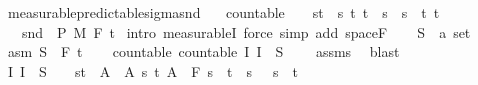 \begin{isabellebody}
\endisatagproof
{\isafoldproof}%
%
\isadelimproof
\isanewline
%
\endisadelimproof
\isanewline
{}\isamarkupfalse%
\ measurable{\isacharunderscore}{\kern0pt}predictable{\isacharunderscore}{\kern0pt}sigma{\isacharunderscore}{\kern0pt}snd{\isacharcolon}{\kern0pt}\isanewline
\ \ \ {\isachardoublequoteopen}countable\ {\isasymI}{\isachardoublequoteclose}\ {\isachardoublequoteopen}{\isasymI}\ {\isasymsubseteq}\ {\isacharbraceleft}{\kern0pt}{\isacharbraceleft}{\kern0pt}s{\isacharless}{\kern0pt}{\isachardot}{\kern0pt}{\isachardot}{\kern0pt}t{\isacharbraceright}{\kern0pt}\ {\isacharbar}{\kern0pt}\ s\ t{\isachardot}{\kern0pt}\ t\ {\isasymle}\ s\ {\isasymand}\ s\ {\isacharless}{\kern0pt}\ t{\isacharbraceright}{\kern0pt}{\isachardoublequoteclose}\ {\isachardoublequoteopen}{\isacharbraceleft}{\kern0pt}t\ {\isasymsubseteq}\ {\isacharparenleft}{\kern0pt}{\isasymUnion}{\isasymI}{\isacharparenright}{\kern0pt}{\isachardoublequoteclose}\isanewline
\ \ \ {\isachardoublequoteopen}snd\ {\isasymin}\ {\isasymSigma}\isactrlsub P\ {\isasymrightarrow}\isactrlsub M\ F\ t\isanewline
%
\isadelimproof
%
\endisadelimproof
%
\isatagproof
{}\isamarkupfalse%
\ {\isacharparenleft}{\kern0pt}intro\ measurableI{\isacharcomma}{\kern0pt}\ force\ simp\ add{\isacharcolon}{\kern0pt}\ space{\isacharunderscore}{\kern0pt}F{\isacharparenright}{\kern0pt}\isanewline
\ \ \isamarkupfalse%
\ S\ {\isacharcolon}{\kern0pt}{\isacharcolon}{\kern0pt}\ {\isachardoublequoteopen}{\isacharprime}{\kern0pt}a\ set{\isachardoublequoteclose}\ \isamarkupfalse%
\ asm{\isacharcolon}{\kern0pt}\ {\isachardoublequoteopen}S\ {\isasymin}\ F\ t\isanewline
\ \ \isamarkupfalse%
\ countable{\isacharcolon}{\kern0pt}\ {\isachardoublequoteopen}countable\ {\isacharparenleft}{\kern0pt}{\isacharparenleft}{\kern0pt}{\isasymlambda}I{\isachardot}{\kern0pt}\ I\ {\isasymtimes}\ S{\isacharparenright}{\kern0pt}\ {\isacharbackquote}{\kern0pt}\ {\isasymI}{\isacharparenright}{\kern0pt}{\isachardoublequoteclose}\ \isamarkupfalse%
\ assms{\isacharparenleft}{\kern0pt}{}{\isacharparenright}{\kern0pt}\ \isamarkupfalse%
\ blast\isanewline
\ \ \isamarkupfalse%
\ {\isachardoublequoteopen}{\isacharparenleft}{\kern0pt}{\isasymlambda}I{\isachardot}{\kern0pt}\ I\ {\isasymtimes}\ S{\isacharparenright}{\kern0pt}\ {\isacharbackquote}{\kern0pt}\ {\isasymI}\ {\isasymsubseteq}\ {\isacharbraceleft}{\kern0pt}{\isacharbraceleft}{\kern0pt}s{\isacharless}{\kern0pt}{\isachardot}{\kern0pt}{\isachardot}{\kern0pt}t{\isacharbraceright}{\kern0pt}\ {\isasymtimes}\ A\ {\isacharbar}{\kern0pt}\ A\ s\ t{\isachardot}{\kern0pt}\ A\ {\isasymin}\ F\ s\ {\isasymand}\ t\ {\isasymle}\ s\ {\isasymand}\ \ s\ {\isacharless}{\kern0pt}\ t{\isacharbraceright}{\kern0pt}{\isachardoublequoteclose}\ \isamarkupfalse%

\end{isabellebody}
